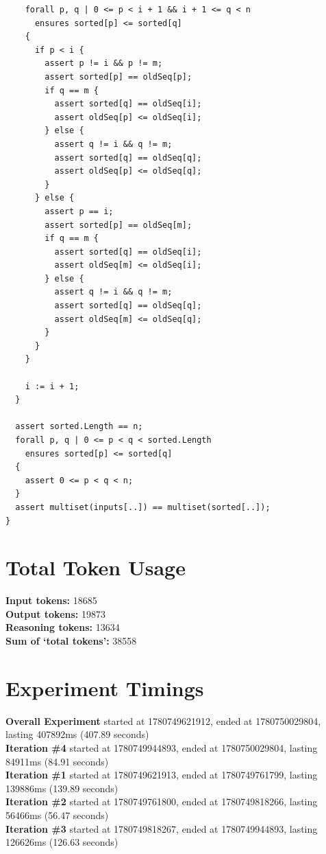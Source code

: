 \documentclass{article}
\begin{document}
\begin{lstlisting}
    forall p, q | 0 <= p < i + 1 && i + 1 <= q < n
      ensures sorted[p] <= sorted[q]
    {
      if p < i {
        assert p != i && p != m;
        assert sorted[p] == oldSeq[p];
        if q == m {
          assert sorted[q] == oldSeq[i];
          assert oldSeq[p] <= oldSeq[i];
        } else {
          assert q != i && q != m;
          assert sorted[q] == oldSeq[q];
          assert oldSeq[p] <= oldSeq[q];
        }
      } else {
        assert p == i;
        assert sorted[p] == oldSeq[m];
        if q == m {
          assert sorted[q] == oldSeq[i];
          assert oldSeq[m] <= oldSeq[i];
        } else {
          assert q != i && q != m;
          assert sorted[q] == oldSeq[q];
          assert oldSeq[m] <= oldSeq[q];
        }
      }
    }

    i := i + 1;
  }

  assert sorted.Length == n;
  forall p, q | 0 <= p < q < sorted.Length
    ensures sorted[p] <= sorted[q]
  {
    assert 0 <= p < q < n;
  }
  assert multiset(inputs[..]) == multiset(sorted[..]);
}
\end{lstlisting}
\section*{Total Token Usage}
\textbf{Input tokens: }18685
\\\textbf{Output tokens: }19873
\\\textbf{Reasoning tokens: }13634
\\\textbf{Sum of `total tokens': }38558
\section*{Experiment Timings}
\textbf{Overall Experiment} started at 1780749621912, ended at 1780750029804, lasting 407892ms (407.89 seconds)
\\\textbf{Iteration \#4} started at 1780749944893, ended at 1780750029804, lasting 84911ms (84.91 seconds)
\\\textbf{Iteration \#1} started at 1780749621913, ended at 1780749761799, lasting 139886ms (139.89 seconds)
\\\textbf{Iteration \#2} started at 1780749761800, ended at 1780749818266, lasting 56466ms (56.47 seconds)
\\\textbf{Iteration \#3} started at 1780749818267, ended at 1780749944893, lasting 126626ms (126.63 seconds)
\end{document}
